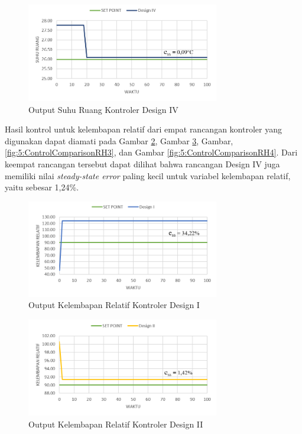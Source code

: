 \begin{figure}[!h]
	\centering
	\includegraphics[width=0.75\textwidth]{figures/ControlComparisonTd4}
	\caption{Output Suhu Ruang Kontroler Design IV}
	\label{fig:5:ControlComparisonTd4}
\end{figure}
\vspace{1em}

Hasil kontrol untuk kelembapan relatif dari empat rancangan kontroler yang digunakan dapat diamati pada Gambar \ref{fig:5:ControlComparisonRH1}, Gambar \ref{fig:5:ControlComparisonRH2}, Gambar, \ref{fig:5:ControlComparisonRH3}, dan Gambar \ref{fig:5:ControlComparisonRH4}. Dari keempat rancangan tersebut dapat dilihat bahwa rancangan Design IV juga memiliki nilai \textit{steady-state error} paling kecil untuk variabel kelembapan relatif, yaitu sebesar 1,24\%.\\
\break
\break

\begin{figure}[!h]
	\centering
	\includegraphics[width=0.75\textwidth]{figures/ControlComparisonRH1}
	\caption{Output Kelembapan Relatif Kontroler Design I}
	\label{fig:5:ControlComparisonRH1}
\end{figure}
\vspace{1em}

\begin{figure}[!h]
	\centering
	\includegraphics[width=0.75\textwidth]{figures/ControlComparisonRH2}
	\caption{Output Kelembapan Relatif Kontroler Design II}
	\label{fig:5:ControlComparisonRH2}
\end{figure}
\vspace{1em}

